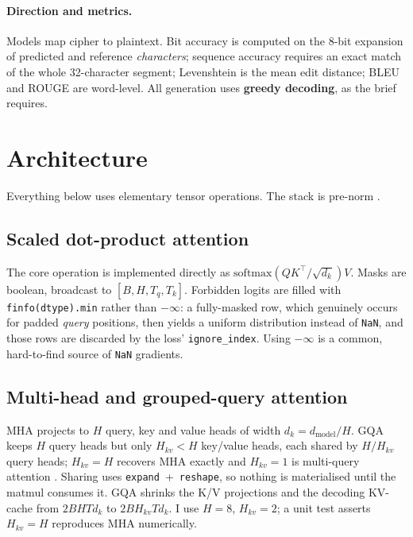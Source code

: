 \documentclass[12pt,a4paper]{article}
\begin{document}
\paragraph{Direction and metrics.} Models map cipher to plaintext.
Bit accuracy is computed on the 8-bit expansion of predicted and reference
\emph{characters}; sequence accuracy requires an exact match of the whole
32-character segment; Levenshtein \citep{levenshtein1966} is the mean edit
distance; BLEU \citep{papineni2002bleu} and ROUGE \citep{lin2004rouge} are
word-level. All generation uses \textbf{greedy decoding}, as the brief requires.

\section{Architecture}
\label{sec:arch}

Everything below uses elementary tensor operations. The stack is pre-norm
\citep{xiong2020prelayernorm}.

\subsection{Scaled dot-product attention}
The core operation is implemented directly as
$\mathrm{softmax}(QK^{\top}/\sqrt{d_k})V$. Masks are boolean, broadcast to
$[B,H,T_q,T_k]$. Forbidden logits are filled with \texttt{finfo(dtype).min}
rather than $-\infty$: a fully-masked row, which genuinely occurs for padded
\emph{query} positions, then yields a uniform distribution instead of
\texttt{NaN}, and those rows are discarded by the loss' \texttt{ignore\_index}.
Using $-\infty$ is a common, hard-to-find source of \texttt{NaN} gradients.

\subsection{Multi-head and grouped-query attention}
MHA projects to $H$ query, key and value heads of width $d_k = d_{\text{model}}/H$.
GQA \citep{ainslie2023gqa} keeps $H$ query heads but only $H_{kv} < H$ key/value
heads, each shared by $H/H_{kv}$ query heads; $H_{kv}=H$ recovers MHA exactly and
$H_{kv}=1$ is multi-query attention \citep{shazeer2019mqa}. Sharing uses
\texttt{expand}~+~\texttt{reshape}, so nothing is materialised until the matmul
consumes it. GQA shrinks the K/V projections and the decoding KV-cache from
$2BHTd_k$ to $2BH_{kv}Td_k$. I use $H=8$, $H_{kv}=2$; a unit test asserts
$H_{kv}=H$ reproduces MHA numerically.
\end{document}
